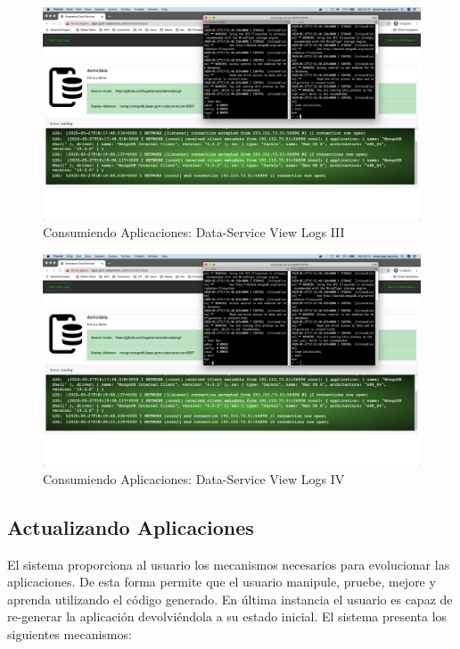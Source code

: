 \documentclass[a4paper,11pt]{book}
\begin{document}
\begin{figure}[H]
\centering
\includegraphics[scale=0.2]{imagenes/casouso/1_16.png}
\caption{ Consumiendo Aplicaciones: Data-Service View Logs III  }
\end{figure}

\begin{figure}[H]
\centering
\includegraphics[scale=0.2]{imagenes/casouso/1_17.png}
\caption{ Consumiendo Aplicaciones: Data-Service View Logs IV   }
\end{figure}



\subsection{Actualizando Aplicaciones}

El sistema proporciona al usuario los mecanismos necesarios para evolucionar las aplicaciones. De esta forma permite que el usuario manipule, pruebe, mejore y aprenda utilizando el código generado. En última instancia el usuario es capaz de re-generar la aplicación devolviéndola a su estado inicial. El sistema presenta los siguientes mecanismos:
\end{document}

